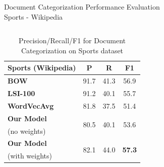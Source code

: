 \documentclass[10pt]{beamer}
\newcommand{\highest}[1]{\textbf{#1}}
\begin{document}
\begin{frame}{Document Categorization Performance Evaluation \\ Sports - Wikipedia }
\begin{columns}[T]
	\hspace{5mm}
	\begin{column}{.4\textwidth}
		\vfill
		\begin{table}[h!]
		\tabcolsep=0.1cm
		\scriptsize
		\begin{center}
		\begin{tabular}{l@{\hskip5mm} c c@{\hskip4mm} c}
		\toprule
		\textbf{Sports (Wikipedia)} & {P} & {R} & \textbf{F1} \\
		\midrule
		\textbf{BOW}
		& 91.7   & 41.3  & 56.9 \\
		\textbf{LSI-100}
		& 91.2   & 40.1  & 55.7 \\
		\textbf{WordVecAvg}
		& 81.8   & 37.5  & 51.4 \\ \addlinespace[1mm]

		\textbf{Our Model}
		& \multirow{2}{*}{80.5}   & \multirow{2}{*}{40.1}  & \multirow{2}{*}{53.6} \\
		(no weights) & & & \\ \addlinespace[1mm]
		\textbf{Our Model}
		& \multirow{2}{*}{82.1}   & \multirow{2}{*}{44.0}  & \multirow{2}{*}{\highest{57.3}} \\
		(with weights) & & & \\
		\bottomrule         
		\end{tabular}
		\caption*{\footnotesize Precision/Recall/F1 for Document Categorization on Sports dataset}
		\end{center}
		\end{table}
	\end{column}
	

\end{columns}
\end{frame}
\end{document}
